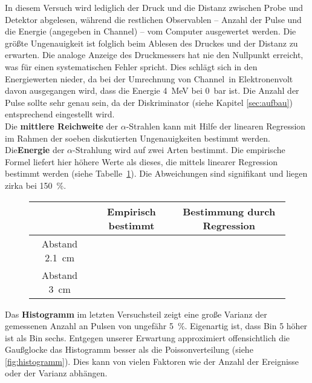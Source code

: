 In diesem Versuch wird lediglich der Druck und die Distanz zwischen Probe und Detektor abgelesen, während die restlichen Observablen -- Anzahl der Pulse und die Energie (angegeben in \glqq Channel\grqq) -- vom Computer ausgewertet werden. Die größte Ungenauigkeit ist folglich beim Ablesen des Druckes und der Distanz zu erwarten. Die analoge Anzeige des Druckmessers hat nie den Nullpunkt erreicht, was für einen systematischen Fehler spricht. Dies schlägt sich in den Energiewerten nieder, da bei der Umrechnung von \glqq Channel\grqq \ in Elektronenvolt davon ausgegangen wird, dass die Energie \SI{4}{\mega\electronvolt} bei \SI{0}{\bar}  ist. Die Anzahl der Pulse sollte sehr genau sein, da der Diskriminator (siehe Kapitel \ref{sec:aufbau}) entsprechend eingestellt wird. \\
Die \textbf{mittlere Reichweite} der $\alpha$-Strahlen kann mit Hilfe der linearen Regression im Rahmen der soeben diskutierten Ungenauigkeiten bestimmt werden.  \\
Die\textbf{Energie} der $\alpha$-Strahlung wird auf zwei Arten bestimmt. Die empirische Formel liefert hier höhere Werte als dieses, die mittels linearer Regression bestimmt werden (siehe Tabelle~\ref{tab:energie_vergleich}). Die Abweichungen sind signifikant und liegen zirka bei \SI{150}{\percent}.

      \begin{figure}[h!]
   	  	\centering
   	  	\begin{tabular}{c|c|c}
   	  		 & Empirisch bestimmt & Bestimmung durch Regression \\
   	  		\hline
   	  	Abstand \SI{2.1}{\centi\meter} &    &   \\
   	  	Abstand \SI{3}{\centi\meter} &   &  
   	  	\end{tabular}
   	  	\label{tab:energie_vergleich}
   	  \end{figure}

Das \textbf{Histogramm} im letzten Versuchsteil zeigt eine große Varianz der gemessenen Anzahl an Pulsen von ungefähr \SI{5}{\percent}. Eigenartig ist, dass Bin 5 höher ist als Bin sechs. Entgegen unserer Erwartung approximiert offensichtlich die Gaußglocke das Histogramm besser als die Poissonverteilung (siehe \ref{fig:histogramm}). Dies kann von vielen Faktoren wie der Anzahl der Ereignisse oder der Varianz abhängen.
